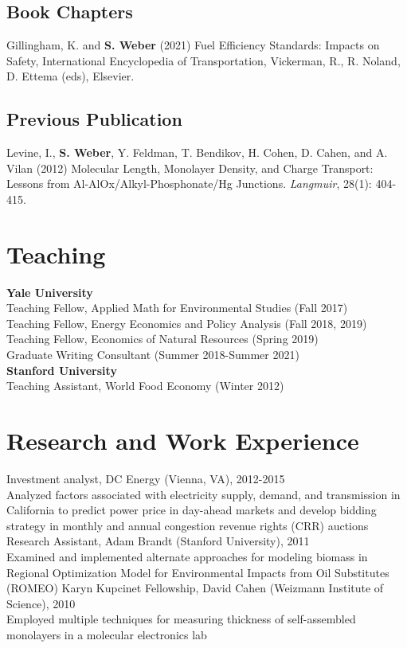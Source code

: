 \documentclass[letterpaper]{article}
\begin{document}
\subsection*{Book Chapters}
Gillingham, K. and \textbf{S. Weber} (2021) Fuel Efficiency Standards: Impacts on Safety, International Encyclopedia of Transportation, Vickerman, R., R. Noland, D. Ettema (eds), Elsevier.

\subsection*{Previous Publication}
Levine, I., \textbf{S. Weber}, Y. Feldman, T. Bendikov, H. Cohen, D. Cahen, and A. Vilan (2012) Molecular Length, Monolayer Density, and Charge Transport: Lessons from Al-AlOx/Alkyl-Phosphonate/Hg Junctions. \textit{Langmuir}, 28(1): 404-415.

\section*{Teaching}
\textbf{Yale University}\\
Teaching Fellow, Applied Math for Environmental Studies (Fall 2017)\\
Teaching Fellow, Energy Economics and Policy Analysis (Fall 2018, 2019)\\
Teaching Fellow, Economics of Natural Resources (Spring 2019)\\
Graduate Writing Consultant (Summer 2018-Summer 2021)\\
\textbf{Stanford University}\\
Teaching Assistant, World Food Economy (Winter 2012)

\section*{Research and Work Experience}
Investment analyst, DC Energy (Vienna, VA), 2012-2015\\
Analyzed factors associated with electricity supply, demand, and transmission in California to predict power price in day-ahead markets and develop bidding strategy in monthly and annual congestion revenue rights (CRR) auctions
\bigbreak
Research Assistant, Adam Brandt (Stanford University), 2011\\
Examined and implemented alternate approaches for modeling biomass in Regional Optimization Model for Environmental Impacts from Oil Substitutes (ROMEO)
\bigbreak
Karyn Kupcinet Fellowship, David Cahen (Weizmann Institute of Science), 2010\\
Employed multiple techniques for measuring thickness of self-assembled monolayers in a molecular electronics lab
\end{document}

